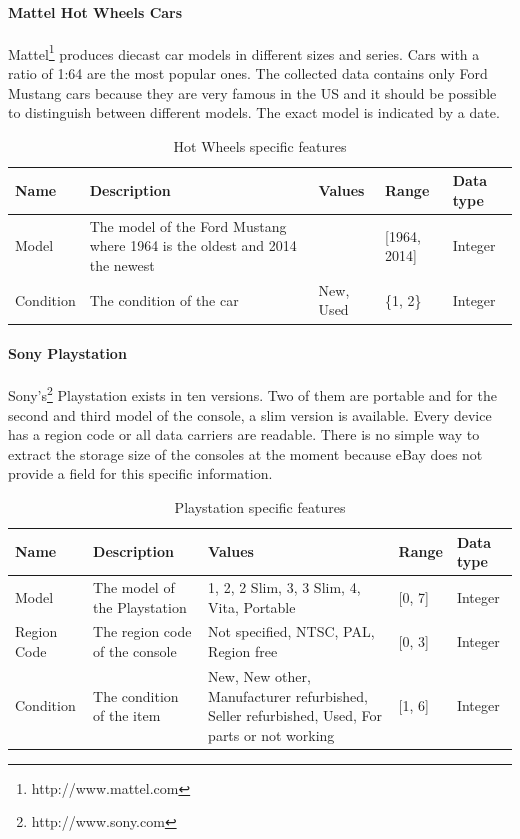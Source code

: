 \paragraph{Mattel Hot Wheels Cars}
Mattel\footnote{http://www.mattel.com} produces diecast car models in different sizes and series. Cars with a ratio of 1:64 are the most popular ones. The collected data contains only Ford Mustang cars because they are very famous in the US and it should be possible to distinguish between different models. The exact model is indicated by a date.
\begin{table}[h!]
	\begin{center}
	\begin{tabular}{| p{2.6cm} | p{2.6cm} | p{2.6cm} | p{2.6cm} | p{2.6cm} |}
		\hline
		\textbf{Name} & \textbf{Description} & \textbf{Values} & \textbf{Range} & \textbf{Data type} \\
		\hline
		Model & The model of the Ford Mustang where 1964 is the oldest and 2014 the newest & & [1964, 2014] & Integer \\
		\hline
		Condition & The condition of the car & New, Used & \{1, 2\} & Integer \\
		\hline
	\end{tabular}
	\end{center}
	\caption{Hot Wheels specific features}
\end{table}

\paragraph{Sony Playstation}
Sony's\footnote{http://www.sony.com} Playstation exists in ten versions. Two of them are portable and for the second and third model of the console, a slim version is available. Every device has a region code or all data carriers are readable. There is no simple way to extract the storage size of the consoles at the moment because eBay does not provide a field for this specific information.
\begin{table}[h!]
	\begin{center}
	\begin{tabular}{| p{2.6cm} | p{2.6cm} | p{2.6cm} | p{2.6cm} | p{2.6cm} |}
		\hline
		\textbf{Name} & \textbf{Description} & \textbf{Values} & \textbf{Range} & \textbf{Data type} \\
		\hline
		Model & The model of the Playstation & 1, 2, 2 Slim, 3, 3 Slim, 4, Vita, Portable & [0, 7] & Integer \\
		\hline
		Region Code & The region code of the console & Not specified, NTSC, PAL, Region free & [0, 3] & Integer \\
		\hline
		Condition & The condition of the item & New, New other, Manufacturer refurbished, Seller refurbished, Used, For parts or not working & [1, 6] & Integer \\
		\hline
	\end{tabular}
	\end{center}
	\caption{Playstation specific features}
\end{table}

